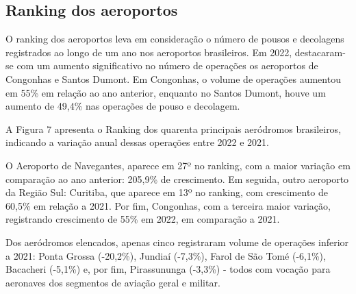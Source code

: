 \documentclass[
]{book}
\begin{document}
\hypertarget{ranking-dos-aeroportos}{%
\subsection{Ranking dos aeroportos}\label{ranking-dos-aeroportos}}

O ranking dos aeroportos leva em consideração o número de pousos e decolagens registrados ao longo de um ano nos aeroportos brasileiros. Em 2022, destacaram-se com um aumento significativo no número de operações os aeroportos de Congonhas e Santos Dumont. Em Congonhas, o volume de operações aumentou em 55\% em relação ao ano anterior, enquanto no Santos Dumont, houve um aumento de 49,4\% nas operações de pouso e decolagem.

A Figura 7 apresenta o Ranking dos quarenta principais aeródromos brasileiros, indicando a variação anual dessas operações entre 2022 e 2021.

O Aeroporto de Navegantes, aparece em 27º no ranking, com a maior variação em comparação ao ano anterior: 205,9\% de crescimento. Em seguida, outro aeroporto da Região Sul: Curitiba, que aparece em 13º no ranking, com crescimento de 60,5\% em relação a 2021. Por fim, Congonhas, com a terceira maior variação, registrando crescimento de 55\% em 2022, em comparação a 2021.

Dos aeródromos elencados, apenas cinco registraram volume de operações inferior a 2021: Ponta Grossa (-20,2\%), Jundiaí (-7,3\%), Farol de São Tomé (-6,1\%), Bacacheri (-5,1\%) e, por fim, Pirassununga (-3,3\%) - todos com vocação para aeronaves dos segmentos de aviação geral e militar.
\end{document}
